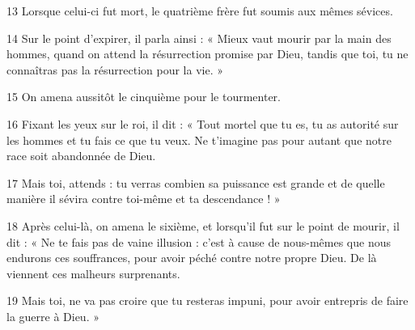 13 Lorsque celui-ci fut mort, le quatrième frère fut soumis aux mêmes sévices.

14 Sur le point d’expirer, il parla ainsi : « Mieux vaut mourir par la main des hommes, quand on attend la résurrection promise par Dieu, tandis que toi, tu ne connaîtras pas la résurrection pour la vie. »

15 On amena aussitôt le cinquième pour le tourmenter.

16 Fixant les yeux sur le roi, il dit : « Tout mortel que tu es, tu as autorité sur les hommes et tu fais ce que tu veux. Ne t’imagine pas pour autant que notre race soit abandonnée de Dieu.

17 Mais toi, attends : tu verras combien sa puissance est grande et de quelle manière il sévira contre toi-même et ta descendance ! »

18 Après celui-là, on amena le sixième, et lorsqu’il fut sur le point de mourir, il dit : « Ne te fais pas de vaine illusion : c’est à cause de nous-mêmes que nous endurons ces souffrances, pour avoir péché contre notre propre Dieu. De là viennent ces malheurs surprenants.

19 Mais toi, ne va pas croire que tu resteras impuni, pour avoir entrepris de faire la guerre à Dieu. »